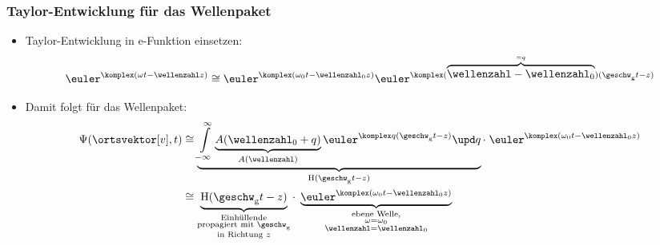  \begin{frame}
  \frametitle{Taylor-Entwicklung für das Wellenpaket}
      \begin{itemize}[<+->]
      \item Taylor-Entwicklung in e-Funktion einsetzen:
        \begin{equation*}
          \euler^{\komplex (\omega t - \wellenzahl z)} \cong \euler^{\komplex(\omega_0 t - \wellenzahl_0 z)} \euler^{\komplex (\overbrace{\wellenzahl - \wellenzahl_0}^{=q})(\geschw_{\mathrm{g}} t - z)}
        \end{equation*}
        \item Damit folgt für das Wellenpaket:
        \begin{align*}
\Psi (\ortsvektor[v], t) &\cong \underbrace{\int\limits_{-\infty}^{\infty} \underbrace{A(\wellenzahl_0 + q)}_{A(\wellenzahl)}\euler^{\komplex q (\geschw_{\mathrm{g}} t - z)}\upd q}_{\mathrm{H}(\geschw_{\mathrm{g}} t -z)} \cdot\; \euler^{\komplex ( \omega_0 t - \wellenzahl_0 z)}\\
& \cong \underbrace{\mathrm{H}(\geschw_{\mathrm{g}} t -z)}_{\substack{\text{Einhüllende}\\ \text{propagiert mit }\geschw_{\mathrm{g}}\\ \text{in Richtung $z$}}}\cdot\; \underbrace{\euler^{\komplex (\omega_0 t - \wellenzahl_0 z)}}_{\substack{\text{ebene Welle,}\\ \omega = \omega_0\\ \wellenzahl = \wellenzahl_0}}
\end{align*}

 \end{itemize}
  \end{frame}

